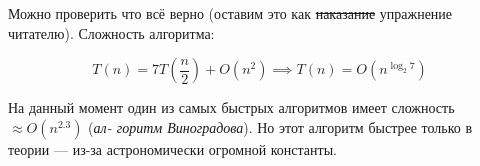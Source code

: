 Можно проверить что всё верно (оставим это как \sout{наказание} упражнение читателю). Сложность алгоритма:

\[T(n) = 7T\left( \frac{n}{2} \right) + O(n^2) \implies T(n) = O\left(n^{\log_{2} 7} \right)\]

На данный момент один из самых быстрых алгоритмов имеет сложность \(\approx O(n^{2.3})\) (\emph{ал-
горитм Виноградова}). Но этот алгоритм быстрее только в теории — из-за астрономически
огромной константы.

